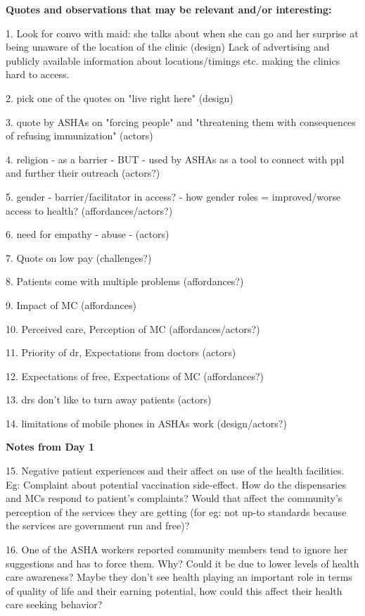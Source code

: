 \textbf{Quotes and observations that may be relevant and/or interesting:}

1. Look for convo with maid: she talks about when she can go and her surprise at being unaware of the location of the clinic (design)
Lack of advertising and publicly available information about locations/timings etc.  making the clinics hard to access.

2. pick one of the quotes on "live right here" (design)

3. quote by ASHAs on "forcing people" and "threatening them with consequences of refusing immunization" (actors)

4. religion - as a barrier - BUT - used by ASHAs as a tool to connect with ppl and further their outreach (actors?)

5. gender - barrier/facilitator in access? - how gender roles = improved/worse access to health? (affordances/actors?)

6. need for empathy - abuse - (actors) 

7. Quote on low pay (challenges?)

8. Patients come with multiple problems (affordances?)

9. Impact of MC (affordances)

10. Perceived care, Perception of MC (affordances/actors?)

11. Priority of dr, Expectations from doctors (actors)

12. Expectations of free, Expectations of MC (affordances?)

13. drs don't like to turn away patients (actors)

14. limitations of mobile phones in ASHAs work (design/actors?)

\textbf{Notes from Day 1}

15. Negative patient experiences and their affect on use of the health facilities. Eg: Complaint about potential vaccination side-effect. How do the dispensaries and MCs respond to patient's complaints? Would that affect the community's perception of the services they are getting (for eg: not up-to standards because the services are government run and free)? 

16. One of the ASHA workers reported community members tend to ignore her suggestions and has to force them. Why? Could it be due to lower levels of health care awareness? Maybe they don't see health playing an important role in terms of quality of life and their earning potential, how could this affect their health care seeking behavior? 

